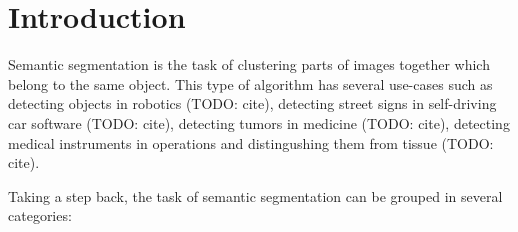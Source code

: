 \section{Introduction}\label{sec:introduction}
Semantic segmentation is the task of clustering parts of images together which
belong to the same object. This type of algorithm has several use-cases such as
detecting objects in robotics (TODO: cite), detecting street signs in
self-driving car software (TODO: cite), detecting tumors in medicine (TODO: cite),
detecting medical instruments in operations and distingushing them from
tissue (TODO: cite).




Taking a step back, the task of semantic segmentation can be grouped in several
categories:

